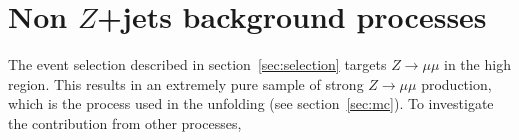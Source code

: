 \section{Non $Z$+jets background processes}
\label{app:bkg-processes}

The event selection described in section~\ref{sec:selection} targets $Z\to\mu\mu$ in the high \ptll{} region. This results in an extremely pure sample of strong $Z\to\mu\mu$ production, which is the process used in the unfolding (see section~\ref{sec:mc}). To investigate the contribution from other processes, 